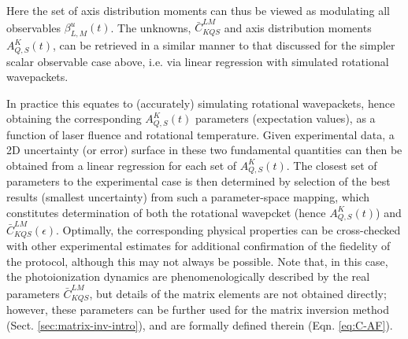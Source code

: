 \documentclass[10pt]{article}
\begin{document}

Here the set of axis distribution moments can thus be viewed as modulating all observables $\beta_{L,M}^{u}(t)$. The unknowns, $\bar{C}_{KQS}^{LM}$ and axis distribution moments $A_{Q,S}^{K}(t)$, can be retrieved in a similar manner to that discussed for the simpler scalar observable case above, i.e. via linear regression with simulated rotational wavepackets. 

In practice this equates to (accurately) simulating rotational wavepackets, hence obtaining the corresponding $A_{Q,S}^{K}(t)$ parameters (expectation values), as a function of laser fluence and rotational temperature. Given experimental data, a 2D uncertainty (or error) surface in these two fundamental quantities can then be obtained from a linear regression for each set of $A_{Q,S}^{K}(t)$. The closest set of parameters to the experimental case is then determined by selection of the best results (smallest uncertainty) from such a parameter-space mapping, which constitutes determination of both the rotational wavepcket (hence $A_{Q,S}^{K}(t)$) and $\bar{C}_{KQS}^{LM}(\epsilon)$. Optimally, the corresponding physical properties can be cross-checked with other experimental estimates for additional confirmation of the fiedelity of the protocol, although this may not always be possible. Note that, in this case, the photoionization dynamics are phenomenologically described by the real parameters $\bar{C}_{KQS}^{LM}$, but details of the matrix elements are not obtained directly; however, these parameters can be further used for the matrix inversion method (Sect. \ref{sec:matrix-inv-intro}), and are formally defined therein (Eqn. \ref{eq:C-AF}).

\end{document}
